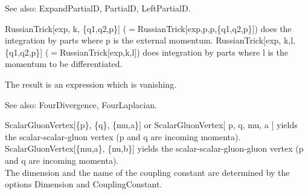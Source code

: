 See also:  ExpandPartialD, PartialD, LeftPartialD.







\dispSFoutmath{
\{ \} 
}


\dispSFoutmath{
\{ \} 
}


\dispSFoutmath{
\{ \} 
}



RussianTrick[exp, k, \{q1,q2,p\}] (\(=\)RussianTrick[exp,p,p,\{q1,q2,p\}]) does the integration by parts where p is the external
  momentum. RussianTrick[exp, k,l, \{q1,q2,p\}] (\(=\)RussianTrick[exp,k,l]) does integration by parts where l is the momentum to be
  differentiated.

The result is an expression which is vanishing.

See also:  FourDivergence, FourLaplacian.



\dispSFoutmath{
\{ \} 
}


\dispSFoutmath{
\{ \} 
}


\dispSFoutmath{
\{ \} 
}


\dispSFoutmath{
\mu 
}

\dispSFinmath{
{{\partial }_{\mu }}
}


\dispSFinmath{
{{\left( \overvar{\partial }{\rightarrow } \right) }_{\mu }}
}



ScalarGluonVertex[\{p\}, \{q\}, \{mu,a\}] or ScalarGluonVertex[ p, { }q, { }mu, a ] yields the scalar-scalar-gluon vertex (p and q are
  incoming momenta).\\
ScalarGluonVertex[\{mu,a\}, \{nu,b\}] yields the scalar-scalar-gluon-gluon vertex (p and q are incoming momenta).\\
The dimension { }and the name of the coupling constant are determined by the options Dimension and CouplingConstant.

